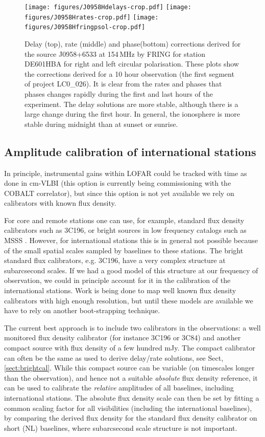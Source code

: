 \documentclass[graybox]{svmult}
\begin{document}
\begin{figure}[htbp]
\begin{center}
\texttt{[image: figures/J0958Hdelays-crop.pdf]}
\texttt{[image: figures/J0958Hrates-crop.pdf]}
\texttt{[image: figures/J0958Hfringpsol-crop.pdf]}
\caption{
Delay (top), rate (middle) and phase(bottom) corrections derived for the source
J0958+6533 at 154\,MHz by FRING for station DE601HBA for right and left
circular polarisation. These plots show the corrections derived for a 10 hour
observation (the first segment of project LC0\_026). It is clear from the rates
and phases that phases changes rapidly during the first and last hours of the
experiment. The delay solutions are more stable, although there is a large
change during the first hour. In general, the ionosphere is more stable during
midnight than at sunset or sunrise.  }

\end{center}
\end{figure}

\subsection{Amplitude calibration of international stations}
In principle, instrumental gains within LOFAR could be tracked with time as
done in cm-VLBI (this option is currently being commissioning with the COBALT
correlator), but since this option is not yet available we rely on calibrators
with known flux density.

For core and remote stations one can use, for example, standard flux density
calibrators such as 3C196, or bright sources in low frequency catalogs such as
MSSS \citep{heald14}. However, for international stations this is in general
not possible because of the small spatial scales sampled by baselines to these
stations.  The bright standard flux calibrators, e.g. 3C196, have a very
complex structure at subarcsecond scales. If we had a good model of this
structure at our frequency of observation, we could in principle account for it
in the calibration of the international stations. Work is being done to map
well known flux density calibrators with high enough resolution, but until
these models are available we have to rely on another boot-strapping technique. 

The current best approach is to include two calibrators in the observations: a
well monitored flux density calibrator (for instance 3C196 or 3C84) and another
compact source with flux density of a few hundred mJy.  The compact calibrator
can often be the same as used to derive delay/rate solutions, see Sect,
\ref{sect:brightcal}.  While this compact source can be variable (on timescales
longer than the observation), and hence not a suitable \emph{absolute} flux density
reference, it can be used to calibrate the \emph{relative} amplitudes of all
baselines, including international stations. The absolute flux density scale can 
then be set by fitting a common scaling factor for all visibilities (including
the international baselines), by comparing the derived flux density 
for the standard flux density calibrator on short (NL) baselines, where
subarcsecond scale structure is not important.
\end{document}
